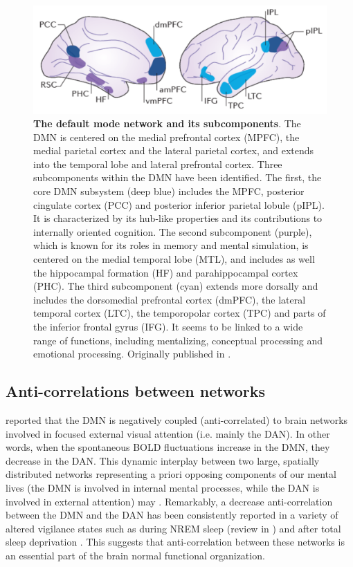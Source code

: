 \begin{figure}[htb]
	\includegraphics[width=\textwidth]{Fig/Methods/fMRI_DMN/Intro_DMN.png}
	\caption[The default mode network and its subcomponents]{\textbf{The default mode network and its subcomponents}. The DMN is centered on the medial prefrontal cortex (MPFC), the medial parietal cortex and the lateral parietal cortex, and extends into the temporal lobe and lateral prefrontal cortex. Three subcomponents within the DMN have been identified. The first, the core DMN subsystem (deep blue) includes the MPFC, posterior cingulate cortex (PCC) and posterior inferior parietal lobule (pIPL). It is characterized by its hub-like properties and its contributions to internally oriented cognition. The second subcomponent (purple), which is known for its roles in memory and mental simulation, is centered on the medial temporal lobe (MTL), and includes as well the hippocampal formation (HF) and parahippocampal cortex (PHC). The third subcomponent (cyan) extends more dorsally and includes the dorsomedial prefrontal cortex (dmPFC), the lateral temporal cortex (LTC), the temporopolar cortex (TPC) and parts of the inferior frontal gyrus (IFG). It seems to be linked to a wide range of functions, including mentalizing, conceptual processing and emotional processing. Originally published in \citet{christoff_mind-wandering_2016}.}
	\label{fig:methods:dmn}
\end{figure}

\subsection{Anti-correlations between networks}
\label{sec:fmri:fc:anti-correl}

\citet{fox_human_2005} reported that the DMN is negatively coupled (anti-correlated) to brain networks involved in focused external visual attention (i.e. mainly the DAN). In other words, when the spontaneous BOLD fluctuations increase in the DMN, they decrease in the DAN. This dynamic interplay between two large, spatially distributed networks representing a priori opposing components of our mental lives (the DMN is involved in internal mental processes, while the DAN is involved in external attention) may  \citep{buckner_opportunities_2013}. Remarkably, a decrease anti-correlation between the DMN and the DAN has been consistently reported in a variety of altered vigilance states such as during NREM sleep (review in \citealp{picchioni_sleep_2013}) and after total sleep deprivation \citep{de_havas_sleep_2012}. This suggests that anti-correlation between these networks is an essential part of the brain normal functional organization.

